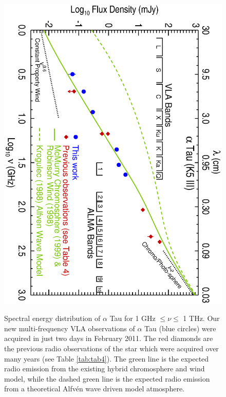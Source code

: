 \documentclass[iop]{emulateapj}
\begin{document}
\begin{figure}
\includegraphics[trim = 0mm 0mm 0mm 0mm, clip,scale=0.62, angle=90]{fig1.ps}
\\
\caption{Spectral energy distribution of $\alpha$ Tau for 1 GHz $\leq \nu \leq$ 1 THz. Our new multi-frequency VLA observations of $\alpha$ Tau (blue circles) were acquired in just two days in February 2011. The red diamonds are the previous radio observations of the star which were acquired over many years (see Table \ref{tab:tab4}). The green line is the expected radio emission from the existing hybrid chromosphere and wind model, while the dashed  green line is the expected radio emission from a theoretical Alfv\'en wave driven model atmosphere.}
\label{fig:fig2}
\end{figure}
\end{document}
